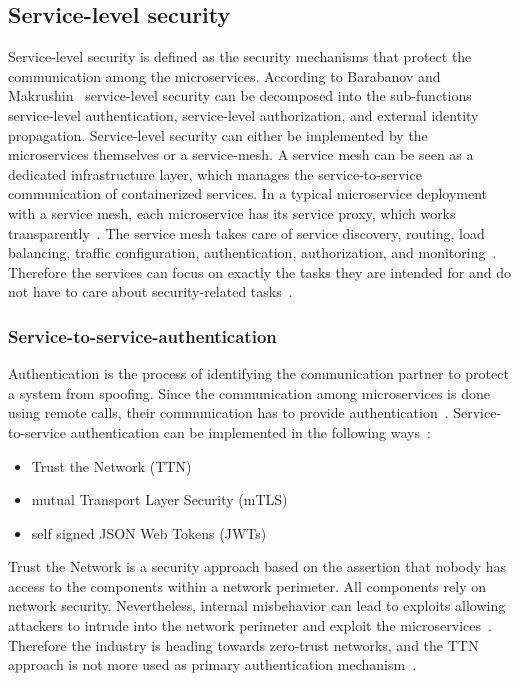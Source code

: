 \subsection{Service-level security}
Service-level security is defined as the security mechanisms that protect the communication among the microservices.
According to Barabanov and Makrushin~\cite{barabanov2020authentication} service-level security can be decomposed into the sub-functions service-level authentication, service-level authorization, and external identity propagation.
Service-level security can either be implemented by the microservices themselves or a service-mesh.
A service mesh can be seen as a dedicated infrastructure layer, which manages the service-to-service communication of containerized services.
In a typical microservice deployment with a service mesh, each microservice has its service proxy, which works transparently~\cite{dias2020microservices}.
The service mesh takes care of service discovery, routing, load balancing, traffic configuration, authentication, authorization, and monitoring~\cite{chandramouli2019microservices}.
Therefore the services can focus on exactly the tasks they are intended for and do not have to care about security-related tasks~\cite{dias2020microservices}.

\subsubsection{Service-to-service-authentication} 
\label{sec:service-to-service-authentication}
Authentication is the process of identifying the communication partner to protect a system from spoofing.
Since the communication among microservices is done using remote calls, their communication has to provide authentication~\cite{dias2020microservices}.
Service-to-service authentication can be implemented in the following ways~\cite{dias2020microservices}:
\begin{itemize}
    \item Trust the Network (TTN)
    \item mutual Transport Layer Security (mTLS)
    \item self signed JSON Web Tokens (JWTs)
\end{itemize}
Trust the Network is a security approach based on the assertion that nobody has access to the components within a network perimeter.
All components rely on network security.
Nevertheless, internal misbehavior can lead to exploits allowing attackers to intrude into the network perimeter and exploit the microservices~\cite{zaheer2019eztrust}. 
Therefore the industry is heading towards zero-trust networks, and the TTN approach is not more used as primary authentication mechanism~\cite{barabanov2020authentication}.

